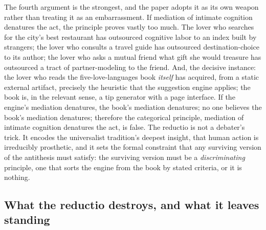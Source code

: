\documentclass[11pt,a4paper]{article}
\begin{document}
The fourth argument is the strongest, and the paper adopts it as its own weapon rather than treating it as an embarrassment. If mediation of intimate cognition denatures the act, the principle proves vastly too much. The lover who searches for the city's best restaurant has outsourced cognitive labor to an index built by strangers; the lover who consults a travel guide has outsourced destination-choice to its author; the lover who asks a mutual friend what gift she would treasure has outsourced a tract of partner-modeling to the friend. And, the decisive instance: the lover who reads the five-love-languages book \emph{itself} has acquired, from a static external artifact, precisely the heuristic that the suggestion engine applies; the book is, in the relevant sense, a tip generator with a page interface. If the engine's mediation denatures, the book's mediation denatures; no one believes the book's mediation denatures; therefore the categorical principle, mediation of intimate cognition denatures the act, is false. The reductio is not a debater's trick. It encodes the universalist tradition's deepest insight, that human action is irreducibly prosthetic, and it sets the formal constraint that any surviving version of the antithesis must satisfy: the surviving version must be a \emph{discriminating} principle, one that sorts the engine from the book by stated criteria, or it is nothing.

\subsection{What the reductio destroys, and what it leaves standing}
\label{p02:sec:thesis-aftermath}
\end{document}
